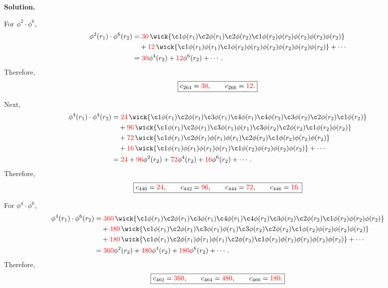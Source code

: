 \documentclass[11pt,a4paper]{article}
\newcounter{problem}
\newcounter{saveequation}
\newenvironment{solution}
{
	\par
	\setcounter{saveequation}{\value{equation}}
	\begingroup
	\setcounter{equation}{0}
	\renewcommand{\theequation}{\arabic{problem}.\arabic{equation}}
	\renewcommand{\theHequation}{sol.\arabic{problem}.\arabic{equation}}
	\noindent\textbf{Solution.}\quad
}
{
	\par
	\endgroup
	\setcounter{equation}{\value{saveequation}}
}
\begin{document}
\begin{solution}
		For \(\phi^2\cdot\phi^6\),
		\begin{align}
			\phi^2(r_1)\cdot\phi^6(r_2)
			&=
			\textcolor{red}{30}\,
			\wick{
				\c1\phi(r_1)\c2\phi(r_1)
				\c2\phi(r_2)\c1\phi(r_2)
				\phi(r_2)\phi(r_2)\phi(r_2)\phi(r_2)
			}
			\notag\\
			&\quad
			+\textcolor{red}{12}\,
			\wick{
				\c1\phi(r_1)\phi(r_1)
				\c1\phi(r_2)
				\phi(r_2)\phi(r_2)\phi(r_2)\phi(r_2)\phi(r_2)
			}
			+\cdots
			\notag\\
			&=
			\textcolor{red}{30}\phi^4(r_2)
			+\textcolor{red}{12}\phi^6(r_2)
			+\cdots .
		\end{align}
		Therefore,
		\[
		\boxed{
			c_{264}=\textcolor{red}{30},
			\qquad
			c_{266}=\textcolor{red}{12}.
		}
		\]
		
		Next,
		\begin{align}
			\phi^4(r_1)\cdot\phi^4(r_2)
			&=
			\textcolor{red}{24}\,
			\wick{
				\c1\phi(r_1)\c2\phi(r_1)\c3\phi(r_1)\c4\phi(r_1)
				\c4\phi(r_2)\c3\phi(r_2)\c2\phi(r_2)\c1\phi(r_2)
			}
			\notag\\
			&\quad
			+\textcolor{red}{96}\,
			\wick{
				\c1\phi(r_1)\c2\phi(r_1)\c3\phi(r_1)\phi(r_1)
				\c3\phi(r_2)\c2\phi(r_2)\c1\phi(r_2)\phi(r_2)
			}
			\notag\\
			&\quad
			+\textcolor{red}{72}\,
			\wick{
				\c1\phi(r_1)\c2\phi(r_1)\phi(r_1)\phi(r_1)
				\c2\phi(r_2)\c1\phi(r_2)\phi(r_2)\phi(r_2)
			}
			\notag\\
			&\quad
			+\textcolor{red}{16}\,
			\wick{
				\c1\phi(r_1)\phi(r_1)\phi(r_1)\phi(r_1)
				\c1\phi(r_2)\phi(r_2)\phi(r_2)\phi(r_2)
			}
			+\cdots
			\notag\\
			&=
			\textcolor{red}{24}
			+\textcolor{red}{96}\phi^2(r_2)
			+\textcolor{red}{72}\phi^4(r_2)
			+\textcolor{red}{16}\phi^6(r_2)
			+\cdots .
		\end{align}
		Therefore,
		\[
		\boxed{
			c_{440}=\textcolor{red}{24},
			\qquad
			c_{442}=\textcolor{red}{96},
			\qquad
			c_{444}=\textcolor{red}{72},
			\qquad
			c_{446}=\textcolor{red}{16}.
		}
		\]
		
		For \(\phi^4\cdot\phi^6\),
		\begin{align}
			\phi^4(r_1)\cdot\phi^6(r_2)
			&=
			\textcolor{red}{360}\,
			\wick{
				\c1\phi(r_1)\c2\phi(r_1)\c3\phi(r_1)\c4\phi(r_1)
				\c4\phi(r_2)\c3\phi(r_2)\c2\phi(r_2)\c1\phi(r_2)
				\phi(r_2)\phi(r_2)
			}
			\notag\\
			&\quad
			+\textcolor{red}{480}\,
			\wick{
				\c1\phi(r_1)\c2\phi(r_1)\c3\phi(r_1)\phi(r_1)
				\c3\phi(r_2)\c2\phi(r_2)\c1\phi(r_2)
				\phi(r_2)\phi(r_2)\phi(r_2)
			}
			\notag\\
			&\quad
			+\textcolor{red}{180}\,
			\wick{
				\c1\phi(r_1)\c2\phi(r_1)\phi(r_1)\phi(r_1)
				\c2\phi(r_2)\c1\phi(r_2)
				\phi(r_2)\phi(r_2)\phi(r_2)\phi(r_2)
			}
			+\cdots
			\notag\\
			&=
			\textcolor{red}{360}\phi^2(r_2)
			+\textcolor{red}{480}\phi^4(r_2)
			+\textcolor{red}{180}\phi^6(r_2)
			+\cdots .
		\end{align}
		Therefore,
		\[
		\boxed{
			c_{462}=\textcolor{red}{360},
			\qquad
			c_{464}=\textcolor{red}{480},
			\qquad
			c_{466}=\textcolor{red}{180}.
		}
		\]
		

\end{solution}
\end{document}
